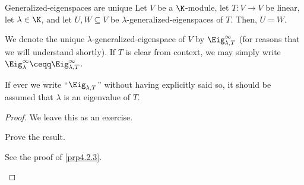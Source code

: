 \begin{prp}{Generalized-eigenspaces are unique}{}
	Let $V$ be a $\K$-module, let $T\colon V\rightarrow V$ be linear, let $\lambda \in \K$, and let $U,W\subseteq V$ be $\lambda$-generalized-eigenspaces of $T$.  Then, $U=W$.
	\begin{rmk}
		We denote the unique $\lambda$-generalized-eigenspace of $V$ by $\Eig _{\lambda ,T}^{\infty}$ (for reasons that we will understand shortly).  If $T$ is clear from context, we may simply write $\Eig _{\lambda}^{\infty}\ceqq \Eig _{\lambda ,T}^{\infty}$\index[notation]{$\Eig _{\lambda}^{\infty}$}.
	\end{rmk}
	\begin{rmk}
		If ever we write ``$\Eig _{\lambda ,T}$'' without having explicitly said so, it should be assumed that $\lambda$ is an eigenvalue of $T$.
	\end{rmk}
	\begin{proof}
		We leave this as an exercise.
		\begin{exr}[breakable=false]{}{}
			Prove the result.
			\begin{rmk}
				See the proof of \cref{prp4.2.3}.
			\end{rmk}
		\end{exr}
	\end{proof}
\end{prp}
